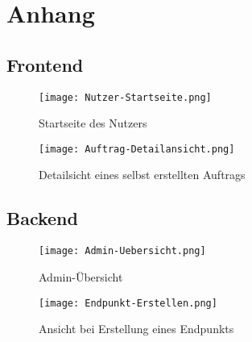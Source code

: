 \section{Anhang}

\subsection{Frontend}
\begin{figure}[!htb]
	\centering
	\texttt{[image: Nutzer-Startseite.png]}
	\caption{Startseite des Nutzers}
\end{figure}
\vspace{1.5cm}
\begin{figure}[!htb]
	\texttt{[image: Auftrag-Detailansicht.png]}
	\caption{Detailsicht eines selbst erstellten Auftrags}
\end{figure}

\newpage
\subsection{Backend}
\begin{figure}[!htb]
	\texttt{[image: Admin-Uebersicht.png]}
	\caption{Admin-Übersicht}
\end{figure}
\vspace{1.5cm}
\begin{figure}[!htb]
	\texttt{[image: Endpunkt-Erstellen.png]}
	\caption{Ansicht bei Erstellung eines Endpunkts}
\end{figure}